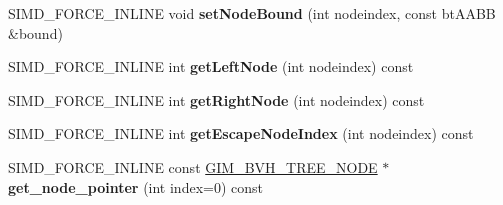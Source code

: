\begin{DoxyCompactItemize}
\item 
\mbox{\label{classbtBvhTree_a789e785f88d84a857ca1931ff85a4b7d}} 
S\+I\+M\+D\+\_\+\+F\+O\+R\+C\+E\+\_\+\+I\+N\+L\+I\+NE void {\bfseries set\+Node\+Bound} (int nodeindex, const bt\+A\+A\+BB \&bound)
\item 
\mbox{\label{classbtBvhTree_ac46b4e7e39ead78998d89a7e89cf910d}} 
S\+I\+M\+D\+\_\+\+F\+O\+R\+C\+E\+\_\+\+I\+N\+L\+I\+NE int {\bfseries get\+Left\+Node} (int nodeindex) const
\item 
\mbox{\label{classbtBvhTree_a3ba8fe7e16650e9b3c0625549ae9020d}} 
S\+I\+M\+D\+\_\+\+F\+O\+R\+C\+E\+\_\+\+I\+N\+L\+I\+NE int {\bfseries get\+Right\+Node} (int nodeindex) const
\item 
\mbox{\label{classbtBvhTree_a8f06e5e1697b5b72a18222881aabd071}} 
S\+I\+M\+D\+\_\+\+F\+O\+R\+C\+E\+\_\+\+I\+N\+L\+I\+NE int {\bfseries get\+Escape\+Node\+Index} (int nodeindex) const
\item 
\mbox{\label{classbtBvhTree_ae86c903c3301ff46eb205129d2321206}} 
S\+I\+M\+D\+\_\+\+F\+O\+R\+C\+E\+\_\+\+I\+N\+L\+I\+NE const \hyperlink{classGIM__BVH__TREE__NODE}{G\+I\+M\+\_\+\+B\+V\+H\+\_\+\+T\+R\+E\+E\+\_\+\+N\+O\+DE} $\ast$ {\bfseries get\+\_\+node\+\_\+pointer} (int index=0) const
\end{DoxyCompactItemize}

